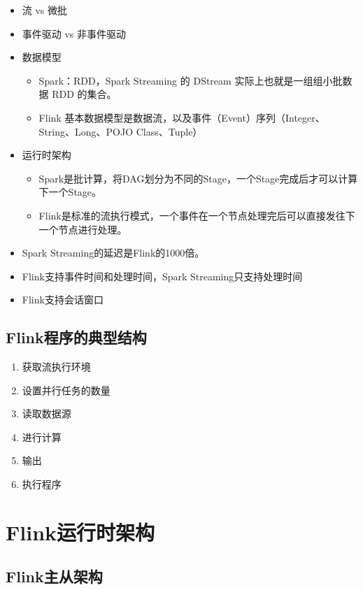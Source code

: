\documentclass[cn,11pt,chinese]{elegantbook}
\begin{document}
\begin{itemize}
  \item 流 vs 微批
  \item 事件驱动 vs 非事件驱动
  \item 数据模型
    \begin{itemize}
      \item Spark：RDD，Spark Streaming 的 DStream 实际上也就是一组组小批数据 RDD 的集合。
      \item Flink 基本数据模型是数据流，以及事件（Event）序列（Integer、String、Long、POJO Class、Tuple）
    \end{itemize}
  \item 运行时架构
    \begin{itemize}
      \item Spark是批计算，将DAG划分为不同的Stage，一个Stage完成后才可以计算下一个Stage。
      \item Flink是标准的流执行模式，一个事件在一个节点处理完后可以直接发往下一个节点进行处理。
    \end{itemize}
  \item Spark Streaming的延迟是Flink的1000倍。
  \item Flink支持事件时间和处理时间，Spark Streaming只支持处理时间
  \item Flink支持会话窗口
\end{itemize}

\section{Flink程序的典型结构}

\begin{enumerate}
  \item 获取流执行环境
  \item 设置并行任务的数量
  \item 读取数据源
  \item 进行计算
  \item 输出
  \item 执行程序
\end{enumerate}

\chapter{Flink运行时架构}

\section{Flink主从架构}
\end{document}
